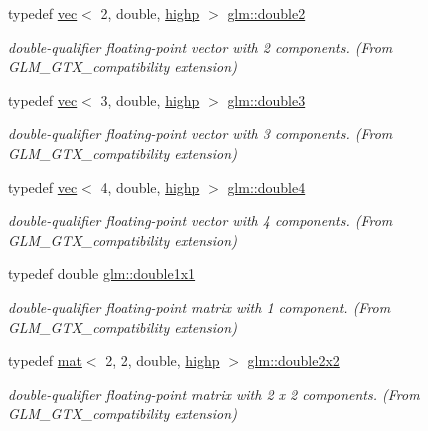 \begin{DoxyCompactItemize}
typedef \hyperlink{structglm_1_1vec}{vec}$<$ 2, double, \hyperlink{namespaceglm_a36ed105b07c7746804d7fdc7cc90ff25ac6f7eab42eacbb10d59a58e95e362074}{highp} $>$ \hyperlink{group__gtx__compatibility_gaadf812a4d848bf77684844269e1d44eb}{glm\+::double2}
\begin{DoxyCompactList}\small\item\em double-\/qualifier floating-\/point vector with 2 components. (From G\+L\+M\+\_\+\+G\+T\+X\+\_\+compatibility extension) \end{DoxyCompactList}\item 
typedef \hyperlink{structglm_1_1vec}{vec}$<$ 3, double, \hyperlink{namespaceglm_a36ed105b07c7746804d7fdc7cc90ff25ac6f7eab42eacbb10d59a58e95e362074}{highp} $>$ \hyperlink{group__gtx__compatibility_ga59c2d0879cea219643aec2f75b8beee9}{glm\+::double3}
\begin{DoxyCompactList}\small\item\em double-\/qualifier floating-\/point vector with 3 components. (From G\+L\+M\+\_\+\+G\+T\+X\+\_\+compatibility extension) \end{DoxyCompactList}\item 
typedef \hyperlink{structglm_1_1vec}{vec}$<$ 4, double, \hyperlink{namespaceglm_a36ed105b07c7746804d7fdc7cc90ff25ac6f7eab42eacbb10d59a58e95e362074}{highp} $>$ \hyperlink{group__gtx__compatibility_gadfb754a50db97dcefbd7a3435ad6eda4}{glm\+::double4}
\begin{DoxyCompactList}\small\item\em double-\/qualifier floating-\/point vector with 4 components. (From G\+L\+M\+\_\+\+G\+T\+X\+\_\+compatibility extension) \end{DoxyCompactList}\item 
typedef double \hyperlink{group__gtx__compatibility_ga1c87d3042377335eb050a20ab0ec148a}{glm\+::double1x1}
\begin{DoxyCompactList}\small\item\em double-\/qualifier floating-\/point matrix with 1 component. (From G\+L\+M\+\_\+\+G\+T\+X\+\_\+compatibility extension) \end{DoxyCompactList}\item 
typedef \hyperlink{structglm_1_1mat}{mat}$<$ 2, 2, double, \hyperlink{namespaceglm_a36ed105b07c7746804d7fdc7cc90ff25ac6f7eab42eacbb10d59a58e95e362074}{highp} $>$ \hyperlink{group__gtx__compatibility_ga38235425d2401904456ecbc342d87453}{glm\+::double2x2}
\begin{DoxyCompactList}\small\item\em double-\/qualifier floating-\/point matrix with 2 x 2 components. (From G\+L\+M\+\_\+\+G\+T\+X\+\_\+compatibility extension) \end{DoxyCompactList}\item 

\end{DoxyCompactItemize}
